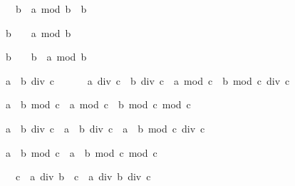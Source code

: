 \begin{isabellebody}
\begin{isamarkuptext}
\begin{isabelle}%
\ \ \ \ \ {\isacharhash}{}\ {\isacharless}\ b\ {\isasymLongrightarrow}\ a\ mod\ b\ {\isacharless}\ b%
\end{isabelle}

\begin{isabelle}%
\ \ \ \ \ b\ {\isacharless}\ {\isacharhash}{}\ {\isasymLongrightarrow}\ a\ mod\ b\ {\isasymle}\ {\isacharhash}{}%
\end{isabelle}

\begin{isabelle}%
\ \ \ \ \ b\ {\isacharless}\ {\isacharhash}{}\ {\isasymLongrightarrow}\ b\ {\isacharless}\ a\ mod\ b%
\end{isabelle}

\begin{isabelle}%
\ \ \ \ \ {\isacharparenleft}a\ {\isacharplus}\ b{\isacharparenright}\ div\ c\ {\isacharequal}\isanewline
\ \ \ \ \ a\ div\ c\ {\isacharplus}\ b\ div\ c\ {\isacharplus}\ {\isacharparenleft}a\ mod\ c\ {\isacharplus}\ b\ mod\ c{\isacharparenright}\ div\ c%
\end{isabelle}

\begin{isabelle}%
\ \ \ \ \ {\isacharparenleft}a\ {\isacharplus}\ b{\isacharparenright}\ mod\ c\ {\isacharequal}\ {\isacharparenleft}a\ mod\ c\ {\isacharplus}\ b\ mod\ c{\isacharparenright}\ mod\ c%
\end{isabelle}

\begin{isabelle}%
\ \ \ \ \ a\ {\isacharasterisk}\ b\ div\ c\ {\isacharequal}\ a\ {\isacharasterisk}\ {\isacharparenleft}b\ div\ c{\isacharparenright}\ {\isacharplus}\ a\ {\isacharasterisk}\ {\isacharparenleft}b\ mod\ c{\isacharparenright}\ div\ c%
\end{isabelle}

\begin{isabelle}%
\ \ \ \ \ a\ {\isacharasterisk}\ b\ mod\ c\ {\isacharequal}\ a\ {\isacharasterisk}\ {\isacharparenleft}b\ mod\ c{\isacharparenright}\ mod\ c%
\end{isabelle}

\begin{isabelle}%
\ \ \ \ \ {\isacharhash}{}\ {\isacharless}\ c\ {\isasymLongrightarrow}\ a\ div\ {\isacharparenleft}b\ {\isacharasterisk}\ c{\isacharparenright}\ {\isacharequal}\ a\ div\ b\ div\ c%
\end{isabelle}


\end{isamarkuptext}
\end{isabellebody}
